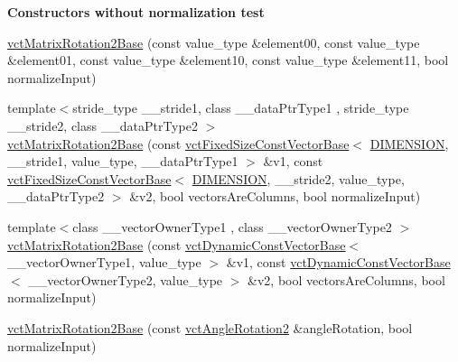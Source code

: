 \begin{Indent}{\bf Constructors without normalization test}
{\begin{DoxyItemize}
\end{DoxyItemize}}\begin{DoxyCompactItemize}
\item 
\hyperlink{classvct_matrix_rotation2_base_ad679cdbef92181ab02a7d054ca4f72a5}{vct\-Matrix\-Rotation2\-Base} (const value\-\_\-type \&element00, const value\-\_\-type \&element01, const value\-\_\-type \&element10, const value\-\_\-type \&element11, bool normalize\-Input)
\item 
{\footnotesize template$<$stride\-\_\-type \-\_\-\-\_\-stride1, class \-\_\-\-\_\-data\-Ptr\-Type1 , stride\-\_\-type \-\_\-\-\_\-stride2, class \-\_\-\-\_\-data\-Ptr\-Type2 $>$ }\\\hyperlink{classvct_matrix_rotation2_base_add62331eccc1a4496afb02be3a7100e7}{vct\-Matrix\-Rotation2\-Base} (const \hyperlink{classvct_fixed_size_const_vector_base}{vct\-Fixed\-Size\-Const\-Vector\-Base}$<$ \hyperlink{classvct_matrix_rotation2_base_ac10279ed12ec787b1a4833ea02771348acefb9855f54f0cfd782e785c9083e592}{D\-I\-M\-E\-N\-S\-I\-O\-N}, \-\_\-\-\_\-stride1, value\-\_\-type, \-\_\-\-\_\-data\-Ptr\-Type1 $>$ \&v1, const \hyperlink{classvct_fixed_size_const_vector_base}{vct\-Fixed\-Size\-Const\-Vector\-Base}$<$ \hyperlink{classvct_matrix_rotation2_base_ac10279ed12ec787b1a4833ea02771348acefb9855f54f0cfd782e785c9083e592}{D\-I\-M\-E\-N\-S\-I\-O\-N}, \-\_\-\-\_\-stride2, value\-\_\-type, \-\_\-\-\_\-data\-Ptr\-Type2 $>$ \&v2, bool vectors\-Are\-Columns, bool normalize\-Input)
\item 
{\footnotesize template$<$class \-\_\-\-\_\-vector\-Owner\-Type1 , class \-\_\-\-\_\-vector\-Owner\-Type2 $>$ }\\\hyperlink{classvct_matrix_rotation2_base_a279e93163ce3c90dc1abe1e7183d1df7}{vct\-Matrix\-Rotation2\-Base} (const \hyperlink{classvct_dynamic_const_vector_base}{vct\-Dynamic\-Const\-Vector\-Base}$<$ \-\_\-\-\_\-vector\-Owner\-Type1, value\-\_\-type $>$ \&v1, const \hyperlink{classvct_dynamic_const_vector_base}{vct\-Dynamic\-Const\-Vector\-Base}$<$ \-\_\-\-\_\-vector\-Owner\-Type2, value\-\_\-type $>$ \&v2, bool vectors\-Are\-Columns, bool normalize\-Input)
\item 
\hyperlink{classvct_matrix_rotation2_base_a7814957ece4e946432467a0cc18df077}{vct\-Matrix\-Rotation2\-Base} (const \hyperlink{classvct_angle_rotation2}{vct\-Angle\-Rotation2} \&angle\-Rotation, bool normalize\-Input)
\end{DoxyCompactItemize}
\end{Indent}
